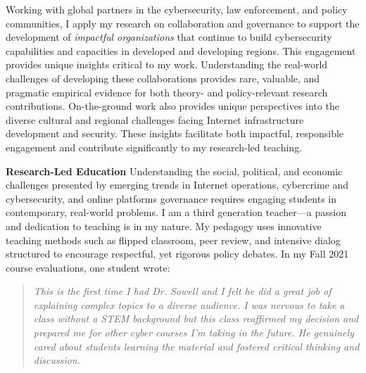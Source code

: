 \documentclass[11pt]{letter}
\begin{document}
\begin{letter}
%
Working with global partners in the cybersecurity, law enforcement, and policy communities, I apply my research on collaboration and governance to support the development of \emph{impactful organizations} that continue to build cybersecurity capabilities and capacities in developed and developing regions. 
%
This engagement provides unique insights critical to my work.
%
Understanding the real-world challenges of developing these collaborations provides rare, valuable, and pragmatic empirical evidence for both theory- and policy-relevant research contributions.
%
%
%
%
%
%
On-the-ground work also provides unique perspectives into the diverse cultural and regional challenges facing Internet infrastructure development and security.
%
These insights facilitate both impactful, responsible engagement and contribute significantly to my research-led teaching.


\textbf{Research-Led Education} \vspace{0.2 \baselineskip} \newline %
%
Understanding the social, political, and economic challenges presented by emerging trends in Internet operations, cybercrime and cybersecurity, and online platforms governance requires engaging students in contemporary, real-world problems.
%
I am a third generation teacher---a passion and dedication to teaching is in my nature.
%
My pedagogy uses innovative teaching methods such as flipped classroom, peer review, and intensive dialog structured to encourage respectful, yet rigorous policy debates.
%
In my Fall 2021 course evaluations, one student wrote:
%
\begin{quote}
  \emph{This is the first time I had Dr. Sowell and I felt he did a great job of explaining complex topics to a diverse audience. I was nervous to take a class without a STEM background but this class reaffirmed my decision and prepared me for other cyber courses I'm taking in the future. He genuinely cared about students learning the material and fostered critical thinking and discussion.}
\end{quote}


\end{letter}
\end{document}
